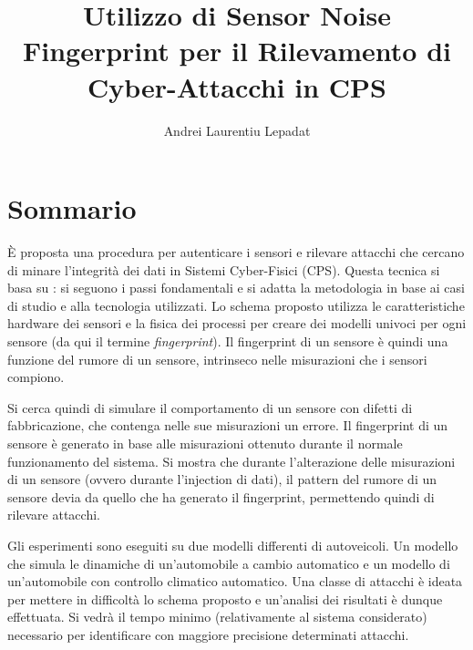 \documentclass[Lau,binding=0.6cm,noexaminfo]{sapthesis}
\title{Utilizzo di Sensor Noise Fingerprint per il Rilevamento di Cyber-Attacchi in CPS}
\author{Andrei Laurentiu Lepadat}
\begin{document}
\frontmatter

\maketitle

\dedication{Ringrazio tutti i familiari e gli amici che mi sono stati vicini, che mi hanno incoraggiato quando pensavo di non farcela e che mi hanno sopportato quando non sapevo fare altro che parlare di universit\`a. Grazie.}


\tableofcontents

\chapter{Sommario} 
\`E proposta una procedura per autenticare i sensori e rilevare attacchi che cercano di minare l'integrit\`a dei dati in Sistemi Cyber-Fisici (CPS).
Questa tecnica si basa su \cite{ahmed2018noise}: si seguono i passi fondamentali e si adatta la metodologia in base ai casi di studio e alla tecnologia utilizzati.
Lo schema proposto utilizza le caratteristiche hardware dei sensori e la fisica dei processi per creare dei modelli univoci per ogni sensore (da qui il termine \textit{fingerprint}).
Il fingerprint di un sensore \`e quindi una funzione del rumore di un sensore, intrinseco nelle misurazioni che i sensori compiono. 

Si cerca quindi di simulare il comportamento di un sensore con difetti di fabbricazione, che contenga nelle sue misurazioni un errore.
Il fingerprint di un sensore \`e generato in base alle misurazioni ottenuto durante il normale funzionamento del sistema.
Si mostra che durante l'alterazione delle misurazioni di un sensore (ovvero durante l'injection di dati), il pattern del rumore di un sensore devia da quello che ha generato il fingerprint, permettendo quindi di rilevare attacchi.

Gli esperimenti sono eseguiti su due modelli differenti di autoveicoli. Un modello che simula le dinamiche di un'automobile a cambio automatico e un modello di un'automobile con controllo climatico automatico.
Una classe di attacchi \`e ideata per mettere in difficolt\`a lo schema proposto e un'analisi dei risultati \`e dunque effettuata.
Si vedr\`a il tempo minimo (relativamente al sistema considerato) necessario per identificare con maggiore precisione determinati attacchi.
\end{document}
